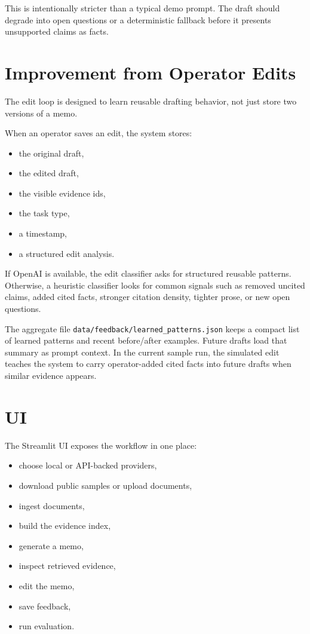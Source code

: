 \documentclass[11pt]{article}
\newcommand{\code}[1]{\texttt{#1}}
\begin{document}
This is intentionally stricter than a typical demo prompt. The draft should degrade into open questions or a deterministic fallback before it presents unsupported claims as facts.

\section{Improvement from Operator Edits}

The edit loop is designed to learn reusable drafting behavior, not just store two versions of a memo.

When an operator saves an edit, the system stores:

\begin{itemize}
  \item the original draft,
  \item the edited draft,
  \item the visible evidence ids,
  \item the task type,
  \item a timestamp,
  \item a structured edit analysis.
\end{itemize}

If OpenAI is available, the edit classifier asks for structured reusable patterns. Otherwise, a heuristic classifier looks for common signals such as removed uncited claims, added cited facts, stronger citation density, tighter prose, or new open questions.

The aggregate file \code{data/feedback/learned\_patterns.json} keeps a compact list of learned patterns and recent before/after examples. Future drafts load that summary as prompt context. In the current sample run, the simulated edit teaches the system to carry operator-added cited facts into future drafts when similar evidence appears.

\section{UI}

The Streamlit UI exposes the workflow in one place:

\begin{itemize}
  \item choose local or API-backed providers,
  \item download public samples or upload documents,
  \item ingest documents,
  \item build the evidence index,
  \item generate a memo,
  \item inspect retrieved evidence,
  \item edit the memo,
  \item save feedback,
  \item run evaluation.
\end{itemize}
\end{document}

